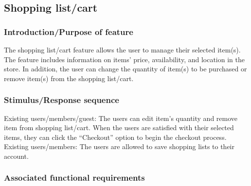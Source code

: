 \documentclass{scrreprt}
\theoremstyle{funreq}
\begin{document}
	\subsection{Shopping list/cart}
	\subsubsection{Introduction/Purpose of feature}
	The shopping list/cart feature allows the user to manage their selected item(s). The feature includes information on items’ price, availability, and location in the store. In addition, the user can change the quantity of item(s) to be purchased or remove item(s) from the shopping list/cart.
	
	\subsubsection{Stimulus/Response sequence}
	Existing users/members/guest:
	The users can edit item’s quantity and remove item from shopping list/cart. When the users are satisfied with their selected items, they can click the “Checkout” option to begin the checkout process. 
	Existing users/members:
	The users are allowed to save shopping lists to their account.
	
	
	\subsubsection{Associated functional requirements}
	
\end{document}
